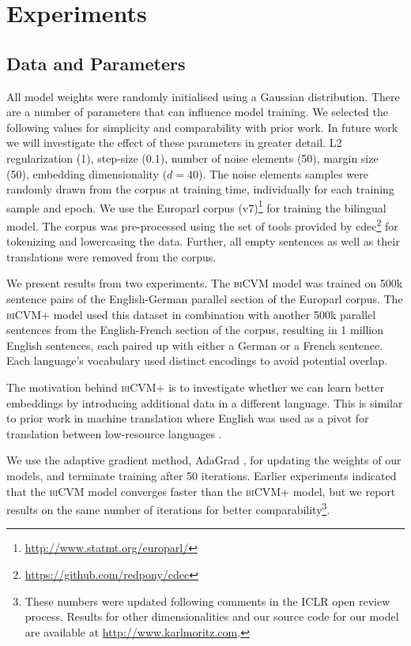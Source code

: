 \documentclass{article} \pdfoutput=1
\newcommand{\biCVM}{\textsc{biCVM}\xspace}
\newcommand{\biCVMplus}{\textsc{biCVM+}\xspace}
\begin{document}
 \section{Experiments}

\subsection{Data and Parameters}

All model weights were randomly initialised using a Gaussian distribution.
There are a number of parameters that can influence model training. We selected
the following values for simplicity and comparability with prior work. In future
work we will investigate the effect of these parameters in greater detail. L2
regularization (1), step-size (0.1), number of noise elements (50), margin size
(50), embedding dimensionality ($d{=}40$).  The noise elements samples were
randomly drawn from the corpus at training time, individually for each training
sample and epoch.  We use the Europarl corpus
(v7)\footnote{\url{http://www.statmt.org/europarl/}} for training the bilingual
model.  The corpus was pre-processed using the set of tools provided by
cdec\footnote{\url{https://github.com/redpony/cdec}} \cite{Dyer:2010} for
tokenizing and lowercasing the data. Further, all empty sentences as well as
their translations were removed from the corpus.

We present results from two experiments.  The \biCVM model was trained on 500k
sentence pairs of the English-German parallel section of the Europarl corpus.
The \biCVMplus model used this dataset in combination with another 500k parallel
sentences from the English-French section of the corpus, resulting in 1 million
English sentences, each paired up with either a German or a French sentence.
Each language's vocabulary used distinct encodings to avoid potential overlap.

The motivation behind \biCVMplus is to investigate whether we can learn better
embeddings by introducing additional data in a different language.  This is
similar to prior work in machine translation where English was used as a pivot
for translation between low-resource languages \cite{Cohn:2007}.

We use the adaptive gradient method, AdaGrad \cite{Duchi:2011}, for updating the
weights of our models, and terminate training after 50 iterations. Earlier
experiments indicated that the \biCVM model converges faster than the \biCVMplus
model, but we report results on the same number of iterations for better
comparability\footnote{These numbers were updated following comments in the ICLR
  open review process. Results for other dimensionalities and our source code
  for our model are available at \url{http://www.karlmoritz.com}.}.
\end{document}
